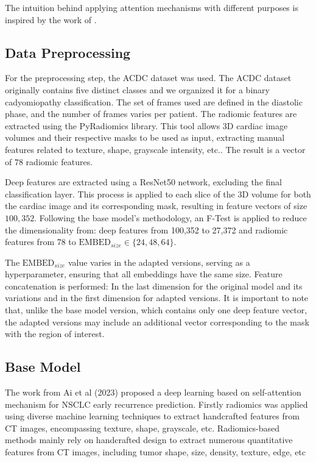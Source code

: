 \documentclass[journal,twoside,web]{ieeecolor}
\begin{document}
The intuition behind applying attention mechanisms with different purposes is inspired by the work of \cite{yangNeuralNetworkDesign2024a}.


\subsection{Data Preprocessing}

For the preprocessing step, the ACDC dataset was used. The ACDC dataset originally contains five distinct classes and we organized it for a binary cadyomiopathy classification. The set of frames used are defined in the diastolic phase, and the number of frames varies per patient. The radiomic features are extracted using the PyRadiomics library. This tool allows 3D cardiac image volumes and their respective masks to be used as input, extracting manual features related to texture, shape, grayscale intensity, etc.. The result is a vector of $78$ radiomic features.

Deep features are extracted using a ResNet50 network, excluding the final classification layer. This process is applied to each slice of the 3D volume for both the cardiac image and its corresponding mask, resulting in feature vectors of size $100,352$. Following the base model's methodology, an F-Test is applied to reduce the dimensionality from: deep features from 100,352 to 27,372 and radiomic features from 78 to $\text{EMBED}_{size} \in \{24, 48, 64\}$.

The $\text{EMBED}_{size}$ value varies in the adapted versions, serving as a hyperparameter, ensuring that all embeddings have the same size. Feature concatenation is performed: In the last dimension for the original model and its variations and in the first dimension for adapted versions. It is important to note that, unlike the base model version, which contains only one deep feature vector, the adapted versions may include an additional vector corresponding to the mask with the region of interest.

\subsection{Base Model}

The work from Ai et al (2023) proposed a deep learning based on self-attention mechanism for \gls{NSCLC} early recurrence prediction. Firstly radiomics was applied using diverse machine learning techniques to extract handcrafted features from \gls{CT} images, encompassing texture, shape, grayscale, etc. Radiomics-based methods mainly rely on handcrafted design to extract numerous quantitative  features from \gls{CT} images, including tumor shape, size, density,  texture, edge, etc \cite{aiSelfAttentionBasedFusion2023}
\end{document}
